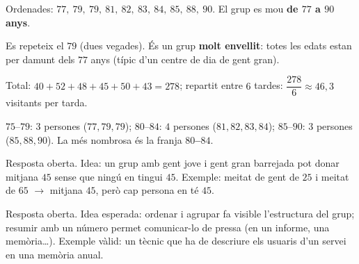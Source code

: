 \begin{solucions}
\begin{sollist}
  \item Ordenades: $77,\ 79,\ 79,\ 81,\ 82,\ 83,\ 84,\ 85,\ 88,\ 90$. El grup es mou
        \textbf{de $77$ a $90$ anys}.
  \item Es repeteix el $79$ (dues vegades). És un grup \textbf{molt envellit}: totes
        les edats estan per damunt dels $77$ anys (típic d'un centre de dia de gent
        gran).
  \item Total: $40+52+48+45+50+43=\num{278}$; repartit entre $6$ tardes:
        $\dfrac{278}{6}\approx 46,3$ visitants per tarda.
  \item $75$–$79$: $3$ persones ($77,79,79$); \quad $80$–$84$: $4$ persones
        ($81,82,83,84$); \quad $85$–$90$: $3$ persones ($85,88,90$). La més nombrosa
        és la franja \textbf{$80$–$84$}.
  \item Resposta oberta. Idea: un grup amb gent jove i gent gran barrejada pot donar
        mitjana $45$ sense que ningú en tingui $45$. Exemple: meitat de gent de $25$ i
        meitat de $65$ $\rightarrow$ mitjana $45$, però cap persona en té $45$.
  \item Resposta oberta. Idea esperada: ordenar i agrupar fa visible l'estructura del
        grup; resumir amb un número permet comunicar-lo de pressa (en un informe, una
        memòria…). Exemple vàlid: un tècnic que ha de descriure els usuaris d'un servei
        en una memòria anual.
\end{sollist}
\end{solucions}
